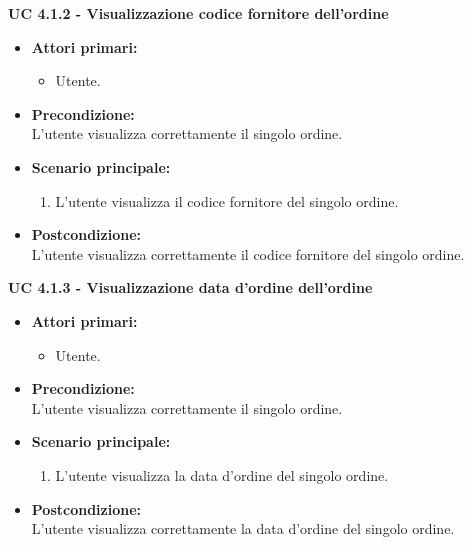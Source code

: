 \vspace{0.5cm}

\noindent \textbf{\large UC 4.1.2 - Visualizzazione codice fornitore dell'ordine}
\label{uc:visualizzazione-codice-fornitore}
\begin{itemize}

	\item \textbf{Attori primari: }
		\begin{itemize}
			\item Utente.
		\end{itemize}

	\item \textbf{Precondizione: }\\[0.3cm]
		L'utente visualizza correttamente il singolo ordine.

	\item \textbf{Scenario principale: }
		\begin{enumerate}
			\item L'utente visualizza il codice fornitore del singolo ordine.
		\end{enumerate}
		

	\item \textbf{Postcondizione: }\\[0.3cm]
		L'utente visualizza correttamente il codice fornitore del singolo ordine.

\end{itemize}

\vspace{0.5cm}

\noindent \textbf{\large UC 4.1.3 - Visualizzazione data d'ordine dell'ordine}
\label{uc:visualizzazione-data-ordine}
\begin{itemize}

	\item \textbf{Attori primari: }
		\begin{itemize}
			\item Utente.
		\end{itemize}

	\item \textbf{Precondizione: }\\[0.3cm]
		L'utente visualizza correttamente il singolo ordine.

	\item \textbf{Scenario principale: }
		\begin{enumerate}
			\item L'utente visualizza la data d'ordine del singolo ordine.
		\end{enumerate}
		

	\item \textbf{Postcondizione: }\\[0.3cm]
		L'utente visualizza correttamente la data d'ordine del singolo ordine.

\end{itemize}

